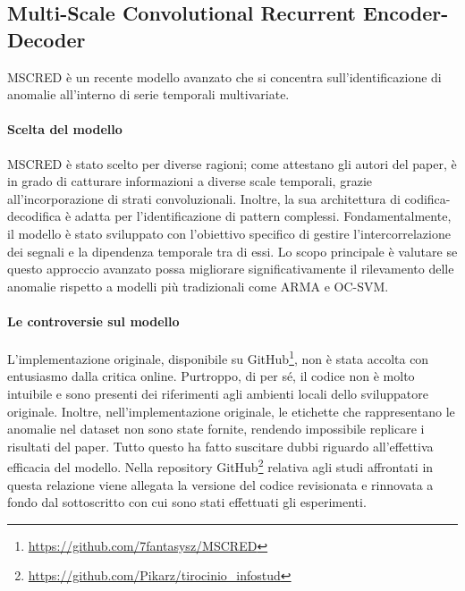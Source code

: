     

\subsection{Multi-Scale Convolutional Recurrent Encoder-Decoder}
    MSCRED\cite{mscred} è un recente modello avanzato che si concentra sull'identificazione di anomalie all'interno di serie 
    temporali multivariate.

    \paragraph{Scelta del modello} MSCRED è stato scelto per diverse ragioni; come attestano gli autori del paper,
    è in grado di catturare informazioni a diverse scale temporali, grazie all'incorporazione di strati convoluzionali. 
    Inoltre, la sua architettura di codifica-decodifica è adatta per l'identificazione di pattern complessi. Fondamentalmente, 
    il modello è stato sviluppato con l'obiettivo specifico di gestire l'intercorrelazione dei segnali e la 
    dipendenza temporale tra di essi. Lo scopo principale è valutare se questo approccio avanzato possa migliorare 
    significativamente il rilevamento delle anomalie rispetto a modelli più tradizionali come 
    ARMA\cite{arma} e OC-SVM\cite{ocsvm}.
    
    
    \paragraph{Le controversie sul modello} L'implementazione originale, disponibile su 
    GitHub\footnote{\url{https://github.com/7fantasysz/MSCRED}}, non è stata accolta con entusiasmo dalla critica online. 
    Purtroppo, di per sé, il codice non è molto intuibile e sono presenti 
    dei riferimenti agli ambienti locali dello sviluppatore originale. Inoltre, nell'implementazione originale, le etichette
    che rappresentano le anomalie nel dataset non sono state fornite, rendendo impossibile replicare i risultati del paper.
    Tutto questo ha fatto suscitare dubbi riguardo all'effettiva efficacia del modello. Nella repository 
    GitHub\footnote{\url{https://github.com/Pikarz/tirocinio\_infostud}} relativa agli studi affrontati in questa relazione viene 
    allegata la versione del codice revisionata e rinnovata a fondo dal sottoscritto con cui sono stati effettuati gli esperimenti.



